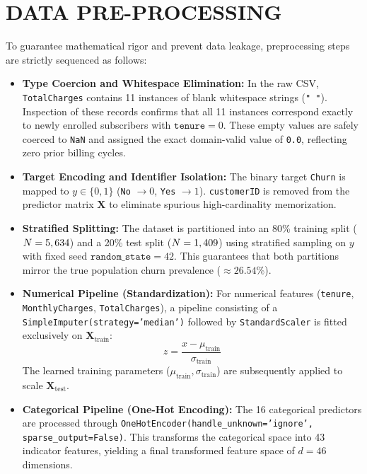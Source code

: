 \section{DATA PRE-PROCESSING}
To guarantee mathematical rigor and prevent data leakage, preprocessing steps are strictly sequenced as follows:
\begin{itemize}
    \item \textbf{Type Coercion and Whitespace Elimination:} In the raw CSV, \texttt{TotalCharges} contains 11 instances of blank whitespace strings (\texttt{" "}). Inspection of these records confirms that all 11 instances correspond exactly to newly enrolled subscribers with $\texttt{tenure} = 0$. These empty values are safely coerced to \texttt{NaN} and assigned the exact domain-valid value of \texttt{0.0}, reflecting zero prior billing cycles.
    \item \textbf{Target Encoding and Identifier Isolation:} The binary target \texttt{Churn} is mapped to $y \in \{0, 1\}$ (\texttt{No} $\to 0$, \texttt{Yes} $\to 1$). \texttt{customerID} is removed from the predictor matrix $\mathbf{X}$ to eliminate spurious high-cardinality memorization.
    \item \textbf{Stratified Splitting:} The dataset is partitioned into an 80\% training split ($N=5,634{}$) and a 20\% test split ($N=1,409{}$) using stratified sampling on $y$ with fixed seed $\texttt{random\_state}=42$. This guarantees that both partitions mirror the true population churn prevalence ($\approx 26.54\%$).
    \item \textbf{Numerical Pipeline (Standardization):} For numerical features (\texttt{tenure}, \texttt{MonthlyCharges}, \texttt{TotalCharges}), a pipeline consisting of a \texttt{SimpleImputer(strategy='median')} followed by \texttt{StandardScaler} is fitted exclusively on $\mathbf{X}_{\text{train}}$:
    \begin{equation}
        z = \frac{x - \mu_{\text{train}}}{\sigma_{\text{train}}}
    \end{equation}
    The learned training parameters ($\mu_{\text{train}}, \sigma_{\text{train}}$) are subsequently applied to scale $\mathbf{X}_{\text{test}}$.
    \item \textbf{Categorical Pipeline (One-Hot Encoding):} The 16 categorical predictors are processed through \texttt{OneHotEncoder(handle\_unknown='ignore', sparse\_output=False)}. This transforms the categorical space into 43 indicator features, yielding a final transformed feature space of $d=46$ dimensions.
\end{itemize}

